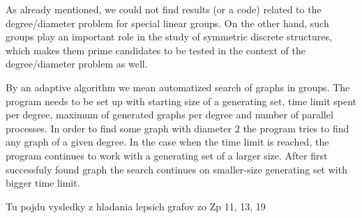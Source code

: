 \documentclass[a4paper,12pt,oneside]{report}%
\begin{document}
As already mentioned, we could not find results (or a code) related to the degree/diameter problem for special linear groups. On the other hand, such groups play an     important role in the study of symmetric discrete structures, which makes them prime candidates to be tested in the context of the degree/diameter problem as well.


By an adaptive algorithm we mean automatized search of graphs in groups. The program needs to be set up with starting size of a generating set, time limit spent per degree, maximum of generated graphs per degree and number of parallel processes. In order to find some graph with diameter $2$ the program tries to find any graph of a given  degree. In the case when the time limit is reached, the program continues to work with a generating set of a larger size. After first successfuly found graph the search continues on smaller-size generating set with bigger time limit.

Tu pojdu vysledky z hladania lepsich grafov zo Zp 11, 13, 19
\end{document}
